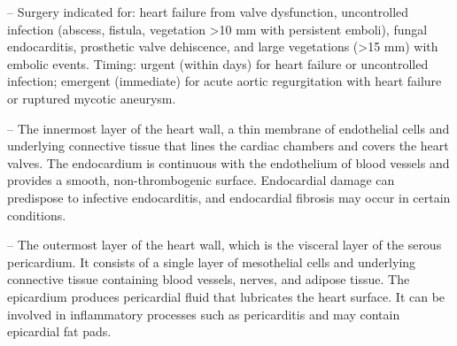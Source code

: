 -- Surgery indicated for: heart failure from valve dysfunction, uncontrolled infection (abscess, fistula, vegetation >10 mm with persistent emboli), fungal endocarditis, prosthetic valve dehiscence, and large vegetations (>15 mm) with embolic events. Timing: urgent (within days) for heart failure or uncontrolled infection; emergent (immediate) for acute aortic regurgitation with heart failure or ruptured mycotic aneurysm.

-- The innermost layer of the heart wall, a thin membrane of endothelial cells and underlying connective tissue that lines the cardiac chambers and covers the heart valves. The endocardium is continuous with the endothelium of blood vessels and provides a smooth, non-thrombogenic surface. Endocardial damage can predispose to infective endocarditis, and endocardial fibrosis may occur in certain conditions.

-- The outermost layer of the heart wall, which is the visceral layer of the serous pericardium. It consists of a single layer of mesothelial cells and underlying connective tissue containing blood vessels, nerves, and adipose tissue. The epicardium produces pericardial fluid that lubricates the heart surface. It can be involved in inflammatory processes such as pericarditis and may contain epicardial fat pads.

